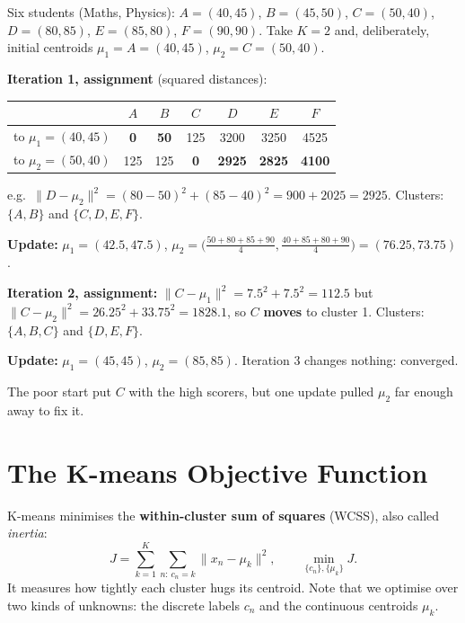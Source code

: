 \documentclass[11pt,a4paper]{article}
\begin{document}
\begin{example}
Six students (Maths, Physics):
$A=(40,45)$, $B=(45,50)$, $C=(50,40)$, $D=(80,85)$, $E=(85,80)$, $F=(90,90)$. Take $K=2$ and, deliberately, initial centroids $\mu_1=A=(40,45)$, $\mu_2=C=(50,40)$.

\textbf{Iteration 1, assignment} (squared distances):
\begin{center}
\begin{tabular}{@{}ccccccc@{}}
\toprule
& $A$ & $B$ & $C$ & $D$ & $E$ & $F$\\
\midrule
to $\mu_1=(40,45)$ & \textbf{0} & \textbf{50} & 125 & 3200 & 3250 & 4525\\
to $\mu_2=(50,40)$ & 125 & 125 & \textbf{0} & \textbf{2925} & \textbf{2825} & \textbf{4100}\\
\bottomrule
\end{tabular}
\end{center}
e.g.\ $\|D-\mu_2\|^2=(80-50)^2+(85-40)^2=900+2025=2925$. Clusters: $\{A,B\}$ and $\{C,D,E,F\}$.

\textbf{Update:} $\mu_1=(42.5,47.5)$, \quad $\mu_2=\big(\frac{50+80+85+90}{4},\frac{40+85+80+90}{4}\big)=(76.25,73.75)$.

\textbf{Iteration 2, assignment:} $\|C-\mu_1\|^2=7.5^2+7.5^2=112.5$ but $\|C-\mu_2\|^2=26.25^2+33.75^2=1828.1$, so $C$ \textbf{moves} to cluster 1. Clusters: $\{A,B,C\}$ and $\{D,E,F\}$.

\textbf{Update:} $\mu_1=(45,45)$, $\mu_2=(85,85)$. Iteration 3 changes nothing: converged.

The poor start put $C$ with the high scorers, but one update pulled $\mu_2$ far enough away to fix it.
\end{example}

\section{The K-means Objective Function}

K-means minimises the \textbf{within-cluster sum of squares} (WCSS), also called \emph{inertia}:
\[
\boxed{\;J=\sum_{k=1}^K\sum_{n:\,c_n=k}\|x_n-\mu_k\|^2,\qquad\min_{\{c_n\},\{\mu_k\}}J.\;}
\]
It measures how tightly each cluster hugs its centroid. Note that we optimise over two kinds of unknowns: the discrete labels $c_n$ and the continuous centroids $\mu_k$.
\end{document}
